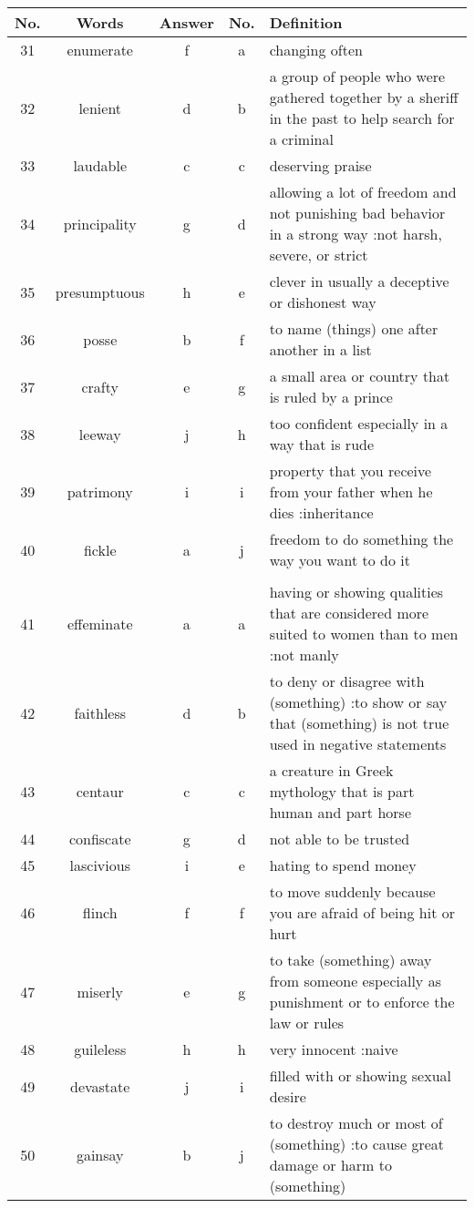 \documentclass[a4paper]{article}
\begin{document}
\begin{center}
\begin{tabular}{|c|c|c|c|m{}|}
\hline
No. & Words & Answer & No. & Definition \\
\hline
 31  & enumerate & f & a &  changing often \\
\hline
 32  & lenient & d & b &  a group of people who were gathered together by a sheriff in the past to help search for a criminal \\
\hline
 33  & laudable & c & c &  deserving praise \\
\hline
 34  & principality & g & d &  allowing a lot of freedom and not punishing bad behavior in a strong way :not harsh, severe, or strict \\
\hline
 35  & presumptuous & h & e &  clever in usually a deceptive or dishonest way \\
\hline
 36  & posse & b & f &  to name (things) one after another in a list \\
\hline
 37  & crafty & e & g &  a small area or country that is ruled by a prince\\
\hline
 38  & leeway & j & h &  too confident especially in a way that is rude \\
\hline
 39  & patrimony & i & i &  property that you receive from your father when he dies :inheritance\\
\hline
 40  & fickle & a & j &  freedom to do something the way you want to do it \\
\hline
 & & & & \\
\hline
 41  & effeminate & a & a &  having or showing qualities that are considered more suited to women than to men :not manly \\
\hline
 42  & faithless & d & b &  to deny or disagree with (something) :to show or say that (something) is not true used in negative statements \\
\hline
 43  & centaur & c & c &  a creature in Greek mythology that is part human and part horse\\
\hline
 44  & confiscate & g & d &  not able to be trusted \\
\hline
 45  & lascivious & i & e &  hating to spend money \\
\hline
 46  & flinch & f & f &  to move suddenly because you are afraid of being hit or hurt \\
\hline
 47  & miserly & e & g &  to take (something) away from someone especially as punishment or to enforce the law or rules \\
\hline
 48  & guileless & h & h &  very innocent :naive \\
\hline
 49  & devastate & j & i &  filled with or showing sexual desire \\
\hline
 50  & gainsay & b & j &  to destroy much or most of (something) :to cause great damage or harm to (something) \\
\end{tabular}
\end{center}
\end{document}
